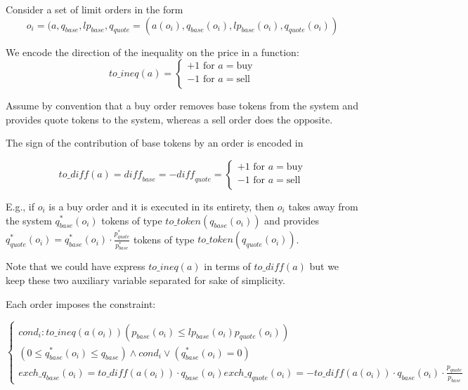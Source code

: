 \documentclass[11pt, reqno]{amsart}
\begin{document}
Consider a set of limit orders in the form
$$o_i = (a, q_{base}, lp_{base}, q_{quote} = (a(o_i), q_{base}(o_i), lp_{base}(o_i), q_{quote}(o_i))$$

We encode the direction of the inequality on the price in a function:
$$
\mathit{to\_ineq}(a) =
\begin{cases}
  +1 \text{ for } a = \text{buy} \\
  -1 \text{ for } a = \text{sell} \\
\end{cases}
$$

Assume by convention that a buy order removes base tokens from the system and
provides quote tokens to the system, whereas a sell order does the opposite.

The sign of the contribution of base tokens by an order is encoded in

$$
\mathit{to\_diff}(a) = \mathit{diff}_{base} = -\mathit{diff}_{quote} =
\begin{cases}
  +1 \text{ for } a = \text{buy} \\
  -1 \text{ for } a = \text{sell} \\
\end{cases}
$$

E.g., if $o_i$ is a buy order and it is executed in its entirety, then $o_i$ takes
away from the system
$q^*_{base}(o_i)$ tokens of type $\mathit{to\_token}(q_{base}(o_i))$
and provides
$q^*_{quote}(o_i) = q^*_{base}(o_i) \cdot \frac{p^*_{quote}}{p^*_{base}}$
tokens of type $\mathit{to\_token}(q_{quote}(o_i))$.

Note that we could have express $\mathit{to\_ineq}(a)$ in terms of
$\mathit{to\_diff}(a)$ but we keep these two auxiliary variable separated for
sake of simplicity.

Each order imposes the constraint:

\begin{equation}
  \begin{cases}
    cond_i: \mathit{to\_ineq}(a(o_i))(p_{base}(o_i) \leq lp_{base}(o_i) p_{quote}(o_i)) \\
    (0 \le q^*_{base}(o_i) \le q_{base}) \land cond_i \lor (q^*_{base}(o_i) = 0) \\
    exch\_q_{base}(o_i) = \mathit{to\_diff}(a(o_i)) \cdot q_{base}(o_i)
    exch\_q_{quote}(o_i) = - \mathit{to\_diff}(a(o_i)) \cdot q_{base}(o_i) \cdot \frac{p_{quote}}{p_{base}}
  \end{cases}
\end{equation}
\end{document}
